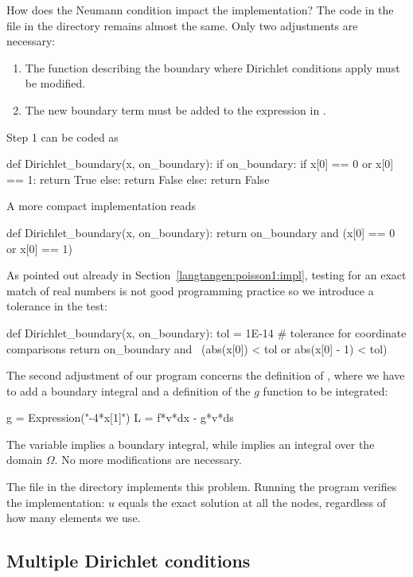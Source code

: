 How does the Neumann condition impact the implementation?  The code
in the file  in the directory
 remains almost the same.  Only two
adjustments are necessary:
\begin{enumerate}
  \item The function describing the boundary where Dirichlet conditions
  apply must be modified.

  \item The new boundary term must be added to the expression in .
\end{enumerate}
Step 1 can be coded as
\begin{python}
def Dirichlet_boundary(x, on_boundary):
    if on_boundary:
        if x[0] == 0 or x[0] == 1:
            return True
        else:
            return False
    else:
        return False
\end{python}

\clearpage

\noindent
A more compact implementation reads
\begin{python}
def Dirichlet_boundary(x, on_boundary):
    return on_boundary and (x[0] == 0 or x[0] == 1)
\end{python}
As pointed out already in Section~\ref{langtangen:poisson1:impl}, testing
for an exact match of real numbers is not good programming practice so
we introduce a tolerance in the test:
\begin{python}
def Dirichlet_boundary(x, on_boundary):
    tol = 1E-14   # tolerance for coordinate comparisons
    return on_boundary and \
           (abs(x[0]) < tol or abs(x[0] - 1) < tol)
\end{python}

The second adjustment of our program concerns the definition of ,
where we have to add a boundary integral and a definition of the $g$
function to be integrated:
\begin{python}
g = Expression("-4*x[1]")
L = f*v*dx - g*v*ds
\end{python}
The  variable implies a boundary integral, while 
implies an integral over the domain $\Omega$.  No more modifications
are necessary.

The file  in the  directory
implements this problem. Running the program verifies the implementation:
$u$ equals the exact solution at all the nodes,
regardless of how many elements we use.


\subsection{Multiple Dirichlet conditions}
\label{langtangen:poisson:multiple:Dirichlet}

